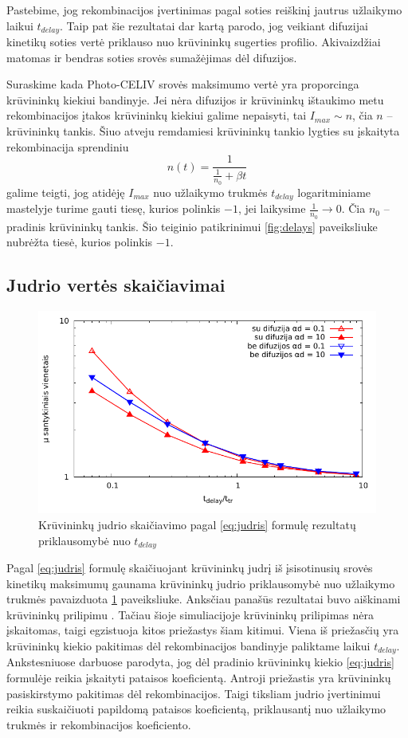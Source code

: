Pastebime, jog rekombinacijos įvertinimas pagal soties reiškinį jautrus užlaikymo laikui $t_{delay}$. Taip pat šie rezultatai dar kartą parodo, jog veikiant difuzijai kinetikų soties vertė priklauso nuo krūvininkų sugerties profilio. Akivaizdžiai matomas ir bendras soties srovės sumažėjimas dėl difuzijos.

Suraskime kada Photo-CELIV srovės maksimumo vertė yra proporcinga krūvininkų kiekiui bandinyje. Jei nėra difuzijos ir krūvininkų ištaukimo metu rekombinacijos įtakos krūvininkų kiekiui galime nepaisyti, tai $I_{max} \sim n$, čia $n$ -- krūvininkų tankis. Šiuo atveju remdamiesi krūvininkų tankio lygties su įskaityta rekombinacija sprendiniu $$ n(t) = \frac{1}{\frac{1}{n_0} + \beta t} $$ galime teigti, jog atidėję $I_{max}$ nuo užlaikymo trukmės $t_{delay}$ logaritminiame mastelyje turime gauti tiesę, kurios polinkis $-1$, jei laikysime $\frac{1}{n_0} \rightarrow 0$. Čia $n_0$ -- pradinis krūvininkų tankis.
Šio teiginio patikrinimui \ref{fig:delays} paveiksliuke nubrėžta tiesė, kurios polinkis $-1$.

\subsection{Judrio vertės skaičiavimai}

\begin{figure}[ht]
  \centering
	\includegraphics{./media/pdf/log_mobility.pdf}
  \caption{Krūvininkų judrio skaičiavimo pagal \eqref{eq:judris} formulę rezultatų priklausomybė nuo $t_{delay}$}
  \label{fig:mobility}
\end{figure}

Pagal \eqref{eq:judris} formulę skaičiuojant krūvininkų judrį iš įsisotinusių srovės kinetikų maksimumų gaunama krūvininkų judrio priklausomybė nuo užlaikymo trukmės pavaizduota \ref{fig:mobility} paveiksliuke. Anksčiau panašūs rezultatai buvo aiškinami krūvininkų prilipimu \cite{???}. Tačiau šioje simuliacijoje krūvininkų prilipimas nėra įskaitomas, taigi egzistuoja kitos priežastys šiam kitimui. Viena iš priežasčių yra krūvininkų kiekio pakitimas dėl rekombinacijos bandinyje paliktame laikui $t_{delay}$. Ankstesniuose darbuose \cite{juška:155202} parodyta, jog dėl pradinio krūvininkų kiekio \eqref{eq:judris} formulėje reikia įskaityti pataisos koeficientą. Antroji priežastis yra krūvininkų pasiskirstymo pakitimas dėl rekombinacijos. Taigi tiksliam judrio įvertinimui reikia suskaičiuoti papildomą pataisos koeficientą, priklausantį nuo užlaikymo trukmės ir rekombinacijos koeficiento.


